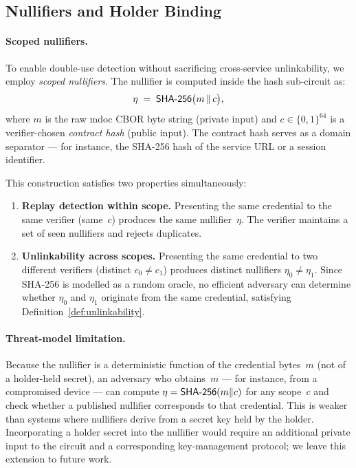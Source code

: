 \subsection{Nullifiers and Holder Binding}\label{sec:nullifiers}

\paragraph{Scoped nullifiers.}
To enable double-use detection without sacrificing cross-service unlinkability, we employ \emph{scoped nullifiers}.  The nullifier is computed inside the hash sub-circuit as:
\[
  \eta \;=\; \mathsf{SHA\textnormal{-}256}\bigl(m \,\|\, c\bigr),
\]
where $m$ is the raw mdoc CBOR byte string (private input) and $c \in \{0,1\}^{64}$ is a verifier-chosen \emph{contract hash} (public input).  The contract hash serves as a domain separator --- for instance, the SHA-256 hash of the service URL or a session identifier.

This construction satisfies two properties simultaneously:
\begin{enumerate}
  \item \textbf{Replay detection within scope.}  Presenting the same credential to the same verifier (same~$c$) produces the same nullifier~$\eta$.  The verifier maintains a set of seen nullifiers and rejects duplicates.
  \item \textbf{Unlinkability across scopes.}  Presenting the same credential to two different verifiers (distinct $c_0 \neq c_1$) produces distinct nullifiers $\eta_0 \neq \eta_1$.  Since SHA-256 is modelled as a random oracle, no efficient adversary can determine whether $\eta_0$ and $\eta_1$ originate from the same credential, satisfying Definition~\ref{def:unlinkability}.
\end{enumerate}

\paragraph{Threat-model limitation.}
Because the nullifier is a deterministic function of the credential bytes~$m$ (not of a holder-held secret), an adversary who obtains~$m$ --- for instance, from a compromised device --- can compute $\eta = \mathsf{SHA\textnormal{-}256}(m \| c)$ for any scope~$c$ and check whether a published nullifier corresponds to that credential.  This is weaker than systems where nullifiers derive from a secret key held by the holder.  Incorporating a holder secret into the nullifier would require an additional private input to the circuit and a corresponding key-management protocol; we leave this extension to future work.

